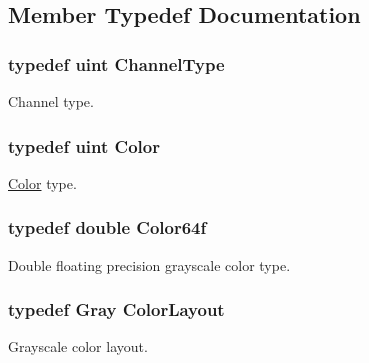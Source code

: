 \subsection{Member Typedef Documentation}
\hypertarget{struct_d_o_1_1_color_traits_3_01uint_01_4_a13416f6d181e4a56a2ca17183638098f}{
\subsubsection[{Channel\-Type}]{\setlength{\rightskip}{0pt plus 5cm}typedef {\bf uint} {\bf Channel\-Type}}}\label{struct_d_o_1_1_color_traits_3_01uint_01_4_a13416f6d181e4a56a2ca17183638098f}
Channel type. \hypertarget{struct_d_o_1_1_color_traits_3_01uint_01_4_a8b2c4dc7fbdc5063366a0c52d63b0d0b}{
\subsubsection[{Color}]{\setlength{\rightskip}{0pt plus 5cm}typedef {\bf uint} {\bf Color}}}\label{struct_d_o_1_1_color_traits_3_01uint_01_4_a8b2c4dc7fbdc5063366a0c52d63b0d0b}
\hyperlink{class_d_o_1_1_color}{Color} type. \hypertarget{struct_d_o_1_1_color_traits_3_01uint_01_4_a9a301fd8ba0a7225e38351d3e5b2e4d3}{
\subsubsection[{Color64f}]{\setlength{\rightskip}{0pt plus 5cm}typedef double {\bf Color64f}}}\label{struct_d_o_1_1_color_traits_3_01uint_01_4_a9a301fd8ba0a7225e38351d3e5b2e4d3}
Double floating precision grayscale color type. \hypertarget{struct_d_o_1_1_color_traits_3_01uint_01_4_a7c9d599cfa0d1404784fbe60e6bcfd24}{
\subsubsection[{Color\-Layout}]{\setlength{\rightskip}{0pt plus 5cm}typedef {\bf Gray} {\bf Color\-Layout}}}\label{struct_d_o_1_1_color_traits_3_01uint_01_4_a7c9d599cfa0d1404784fbe60e6bcfd24}
Grayscale color layout. 

